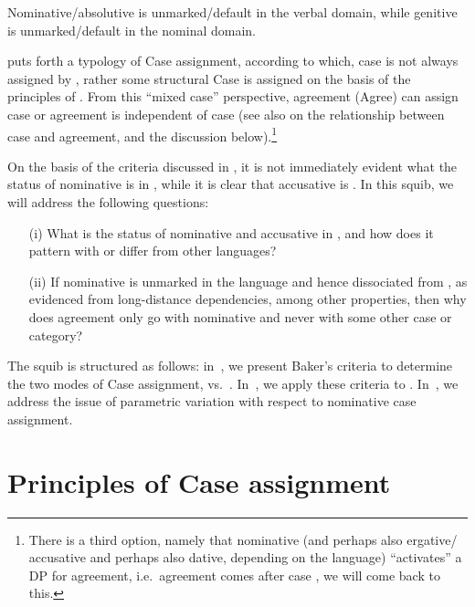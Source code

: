 \documentclass[output=paper]{langsci/langscibook}
\begin{document}
Nominative/absolutive is unmarked/default in the verbal domain, while genitive
is unmarked/default in the nominal domain.

\citet{Baker2015} puts forth a typology of Case assignment, according to which,
case is not always assigned by , rather some structural Case is
assigned on the basis of the principles of . From this
\enquote{mixed case} perspective, agreement (Agree) can assign case or
agreement is independent of case (see also \citealt{Baker2008} on the
relationship between case and agreement, and the discussion
below).\footnote{There is a third option, namely that nominative (and perhaps also ergative/ accusative and perhaps also dative, depending
on the language) \enquote{activates} a DP for agreement, i.e.\  agreement comes
after case \citep{Bobaljik2008}, we will come back to this.}

On the basis of the criteria discussed in \textcite{Baker2008,Baker2015}, it is
not immediately evident what the status of nominative is in , while it is
clear that accusative is . In this squib, we will address the
following questions:

\begin{itemize}

    \item[(i)] What is the status of nominative and accusative in , and
        how does it pattern with or differ from other languages?

    \item[(ii)] If nominative is unmarked in the language
        and hence dissociated from , as evidenced from long-distance
        dependencies, among other properties, then why does agreement only go
        with nominative and never with some other case or
        category?

\end{itemize}

The squib is structured as follows: in~, we
present Baker’s criteria to determine the two modes of Case assignment,
 vs.\ . In~, we apply these
criteria to .  In~, we address the issue of
parametric variation with respect to nominative case
assignment.

\section{Principles of Case assignment}\label{sec:key:13.2}
\end{document}
